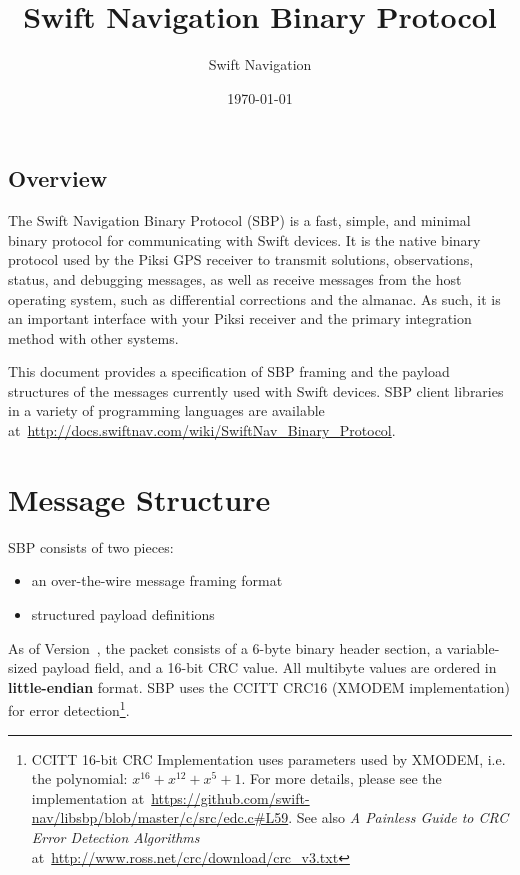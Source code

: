 \documentclass{article}
\title{Swift Navigation Binary Protocol}
\author{Swift Navigation}
\date{\today}
\makeatletter
\numberwithin{table}{subsection}
\numberwithin{field}{subsection}
\renewcommand\tableofcontents{\@starttoc{toc}}
\makeatother
\begin{document}
\maketitle
\begin{normalsize}
\setcounter{tocdepth}{2}
\begin{centering}
\tableofcontents
\end{centering}
\end{normalsize}

\thispagestyle{firstpage}
\bigskip
\bigskip
\begin{large}
\section{Overview}
\label{sec:Overview}
The Swift Navigation Binary Protocol (SBP) is a fast, simple, and
minimal binary protocol for communicating with Swift devices. It is
the native binary protocol used by the Piksi GPS receiver to transmit
solutions, observations, status, and debugging messages, as well as
receive messages from the host operating system, such as differential
corrections and the almanac. As such, it is an important interface
with your Piksi receiver and the primary integration method with other
systems.

This document provides a specification of SBP framing and the payload
structures of the messages currently used with Swift devices. SBP
client libraries in a variety of programming languages are available
at~\url{http://docs.swiftnav.com/wiki/SwiftNav_Binary_Protocol}.

\end{large}

\newpage
\section{Message Structure}
\label{sec:Message}

\begin{large}
SBP consists of two pieces:
\begin{itemize}
  \item an over-the-wire message framing format
  \item structured payload definitions
\end{itemize}
As of Version~\theversion, the packet consists of a 6-byte binary
header section, a variable-sized payload field, and a 16-bit CRC
value. All multibyte values are ordered in \textbf{little-endian}
format. SBP uses the CCITT CRC16 (XMODEM implementation) for error
detection\footnote{CCITT 16-bit CRC Implementation uses parameters
  used by XMODEM, i.e. the polynomial: $x^{16} + x^{12} + x^5 +
  1$. For more details, please see the implementation
  at~\url{https://github.com/swift-nav/libsbp/blob/master/c/src/edc.c\#L59}. See
  also \emph{A Painless Guide to CRC Error Detection Algorithms}
  at~\url{http://www.ross.net/crc/download/crc_v3.txt}}.

\end{large}
\end{document}
